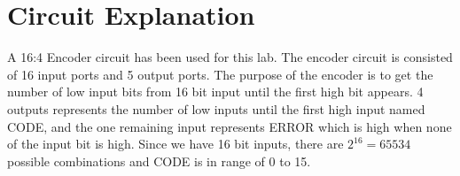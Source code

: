 \documentclass[Report1]{subfiles}
\begin{document}
\section{Circuit Explanation}
A 16:4 Encoder circuit has been used for this lab. The encoder circuit is consisted of 16 input ports and 5 output ports. The purpose of the encoder is to get the number of low input bits from 16 bit input until the first high bit appears. 4 outputs represents the number of low inputs until the first high input named CODE, and the one remaining input represents ERROR which is high when none of the input bit is high. Since we have 16 bit inputs, there are $2^{16}=65534$ possible combinations and CODE is in range of 0 to 15.
\end{document}
